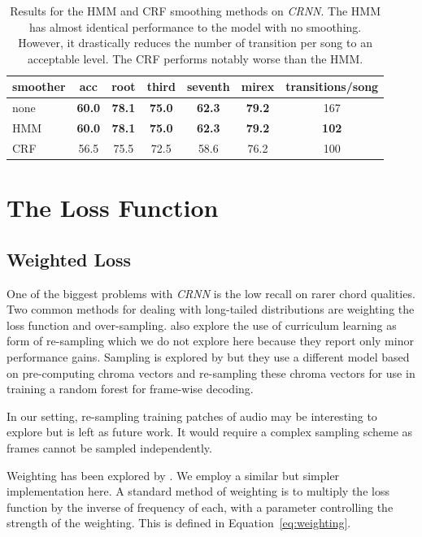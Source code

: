 \begin{table}[h]
    \centering
    \begin{tabular}{lcccccc}
        \toprule
        smoother & acc & root & third & seventh & mirex & transitions/song\\  
        \midrule
        none & \textbf{60.0} & \textbf{78.1} & \textbf{75.0} & \textbf{62.3} & \textbf{79.2} & 167 \\
        HMM & \textbf{60.0} &\textbf{78.1} & \textbf{75.0} & \textbf{62.3} & \textbf{79.2} & \textbf{102} \\
        CRF & 56.5 & 75.5 & 72.5 & 58.6 & 76.2 & 100 \\
        \bottomrule
    \end{tabular}
    \caption{Results for the HMM and CRF smoothing methods on \emph{CRNN}. The HMM has almost identical performance to the model with no smoothing. However, it drastically reduces the number of transition per song to an acceptable level. The CRF performs notably worse than the HMM. }\label{tab:smoothers}
\end{table}

\section{The Loss Function}

\subsection{Weighted Loss}\label{sec:weighted_loss}

One of the biggest problems with \emph{CRNN} is the low recall on rarer chord qualities. Two common methods for dealing with long-tailed distributions are weighting the loss function and over-sampling. \citet{CurriculumLearning} also explore the use of curriculum learning as form of re-sampling which we do not explore here because they report only minor performance gains. Sampling is explored by \citet{BalanceRandomForestACR} but they use a different model based on pre-computing chroma vectors and re-sampling these chroma vectors for use in training a random forest for frame-wise decoding. 

In our setting, re-sampling training patches of audio may be interesting to explore but is left as future work. It would require a complex sampling scheme as frames cannot be sampled independently. 

Weighting has been explored by \citet{ACRLargeVocab1}. We employ a similar but simpler implementation here. A standard method of weighting is to multiply the loss function by the inverse of frequency of each, with a parameter controlling the strength of the weighting. This is defined in Equation~\ref{eq:weighting}.

